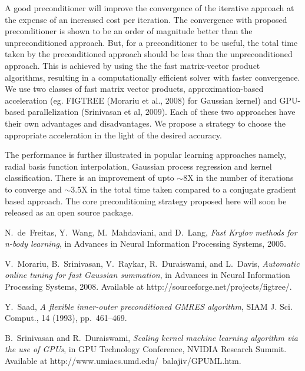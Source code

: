 \documentclass{report}
\begin{document}
A good preconditioner will improve the convergence of the iterative
approach at the expense of an increased cost per iteration. The
convergence with proposed preconditioner is shown to be an order of
magnitude better than the unpreconditioned approach. But, for a
preconditioner to be useful, the total time taken by the preconditioned
approach should be less than the unpreconditioned approach. This is
achieved by using the the fast matrix-vector product algorithms,
resulting in a computationally efficient solver with faster convergence.
We use two classes of fast matrix vector products, approximation-based
acceleration (eg. FIGTREE (Morariu et al., $2008$) for Gaussian kernel)
and GPU-based parallelization (Srinivasan et al, $2009$). Each of these
two approaches have their own advantages and disadvantages. We propose a
strategy to choose the appropriate acceleration in the light of the
desired accuracy.

The performance is further illustrated in popular learning approaches
namely, radial basis function interpolation, Gaussian process regression
and kernel classification. There is an improvement of upto $\sim8$X in
the number of iterations to converge and $\sim3.5$X in the total time
taken compared to a conjugate gradient based approach. The core
preconditioning strategy proposed here will soon be released as an open
source package.


\begin{thebibliography}{1}

{\sc N.~de~Freitas, Y.~Wang, M.~Mahdaviani, and D.~Lang}, {\em Fast
\uppercase{k}rylov methods for n-body learning}, in Advances in Neural
Information Processing Systems, 2005.

{\sc V.~Morariu, B.~Srinivasan, V.~Raykar, R.~Duraiswami, and L.~Davis}, {\em
Automatic online tuning for fast \uppercase{G}aussian summation}, in Advances
in Neural Information Processing Systems, 2008.
\newblock Available at http://sourceforge.net/projects/figtree/.

{\sc Y.~Saad}, {\em A flexible inner-outer preconditioned \uppercase{GMRES}
algorithm}, SIAM J. Sci. Comput., 14 (1993), pp.~461--469.

{\sc B.~Srinivasan and R.~Duraiswami}, {\em Scaling kernel machine learning
algorithm via the use of \uppercase{GPU}s}, in GPU Technology Conference,
\uppercase{NVIDIA} Research Summit.
\newblock Available at http://www.umiacs.umd.edu/~balajiv/GPUML.htm.

\end{thebibliography}
\end{document}
